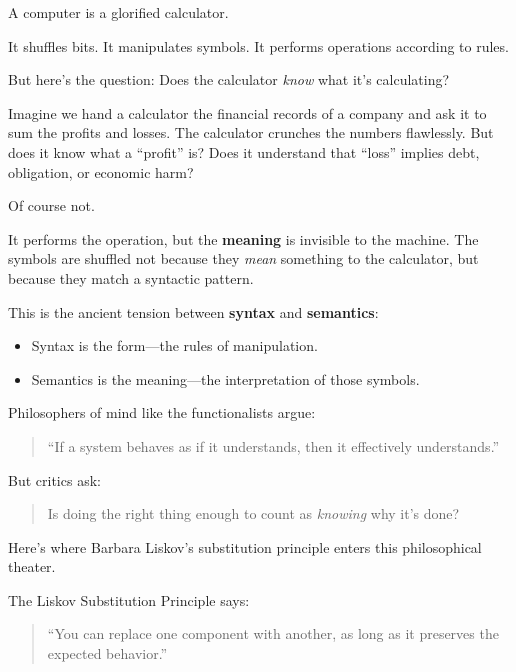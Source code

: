 \begin{tcolorbox}[colback=gray!5!white, colframe=black, breakable, title=\textbf{Sidebar: Can a Calculator Understand Accounting?},fonttitle=\bfseries]

  A computer is a glorified calculator.

  It shuffles bits. It manipulates symbols. It performs operations according to rules.

  But here’s the question:  
  \medskip
  Does the calculator \emph{know} what it’s calculating?
  
  \medskip
  
  Imagine we hand a calculator the financial records of a company and ask it to sum the profits and losses. The calculator crunches the numbers flawlessly. But does it know what a “profit” is? Does it understand that “loss” implies debt, obligation, or economic harm?

  Of course not.

  It performs the operation, but the \textbf{meaning} is invisible to the machine. The symbols are shuffled not because they \textit{mean} something to the calculator, but because they match a syntactic pattern.

  \medskip
  
  This is the ancient tension between \textbf{syntax} and \textbf{semantics}:  
  \begin{itemize}
    \item Syntax is the form—the rules of manipulation.
    \item Semantics is the meaning—the interpretation of those symbols.
  \end{itemize}
  
  \medskip
  
  Philosophers of mind like the functionalists argue:  
  \begin{quote}
  “If a system behaves as if it understands, then it effectively understands.”
  \end{quote}
  
  But critics ask:  
  \begin{quote}
  Is doing the right thing enough to count as \emph{knowing} why it’s done?
  \end{quote}
  
  \medskip
  
  Here’s where Barbara Liskov’s substitution principle enters this philosophical theater.

  The Liskov Substitution Principle says:  
  \begin{quote}
  “You can replace one component with another, as long as it preserves the expected behavior.”
  \end{quote}


\end{tcolorbox}
